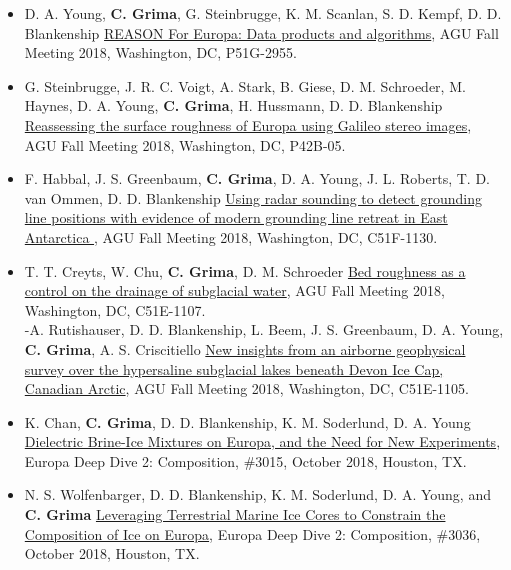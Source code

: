 \begin{itemize}
\item
  D. A. Young, \textbf{C. Grima}, G. Steinbrugge, K. M. Scanlan, S. D.
  Kempf, D. D. Blankenship
  \href{https://agu.confex.com/agu/fm18/meetingapp.cgi/Paper/466083}{REASON
  For Europa: Data products and algorithms}, AGU Fall Meeting 2018,
  Washington, DC, P51G-2955.
\item
  G. Steinbrugge, J. R. C. Voigt, A. Stark, B. Giese, D. M. Schroeder,
  M. Haynes, D. A. Young, \textbf{C. Grima}, H. Hussmann, D. D.
  Blankenship
  \href{https://agu.confex.com/agu/fm18/meetingapp.cgi/Paper/381734}{Reassessing
  the surface roughness of Europa using Galileo stereo images}, AGU Fall
  Meeting 2018, Washington, DC, P42B-05.
\item
  F. Habbal, J. S. Greenbaum, \textbf{C. Grima}, D. A. Young, J. L.
  Roberts, T. D. van Ommen, D. D. Blankenship
  \href{https://agu.confex.com/agu/fm18/meetingapp.cgi/Paper/454958}{
  Using radar sounding to detect grounding line positions with evidence
  of modern grounding line retreat in East Antarctica }, AGU Fall
  Meeting 2018, Washington, DC, C51F-1130.
\item
  T. T. Creyts, W. Chu, \textbf{C. Grima}, D. M. Schroeder
  \href{https://agu.confex.com/agu/fm18/meetingapp.cgi/Paper/457826}{Bed
  roughness as a control on the drainage of subglacial water}, AGU Fall
  Meeting 2018, Washington, DC, C51E-1107.\\
  -A. Rutishauser, D. D. Blankenship, L. Beem, J. S. Greenbaum, D. A.
  Young, \textbf{C. Grima}, A. S. Criscitiello
  \href{https://agu.confex.com/agu/fm18/meetingapp.cgi/Paper/465144}{
  New insights from an airborne geophysical survey over the hypersaline
  subglacial lakes beneath Devon Ice Cap, Canadian Arctic}, AGU Fall
  Meeting 2018, Washington, DC, C51E-1105.
\item
  K. Chan, \textbf{C. Grima}, D. D. Blankenship, K. M. Soderlund, D. A.
  Young
  \href{https://www.hou.usra.edu/meetings/europadeepdive2018/pdf/3015.pdf}{Dielectric
  Brine-Ice Mixtures on Europa, and the Need for New Experiments},
  Europa Deep Dive 2: Composition, \#3015, October 2018, Houston, TX.
\item
  N. S. Wolfenbarger, D. D. Blankenship, K. M. Soderlund, D. A. Young,
  and \textbf{C. Grima}
  \href{https://www.hou.usra.edu/meetings/europadeepdive2018/pdf/3036.pdf}{Leveraging
  Terrestrial Marine Ice Cores to Constrain the Composition of Ice on
  Europa}, Europa Deep Dive 2: Composition, \#3036, October 2018,
  Houston, TX.

\end{itemize}
